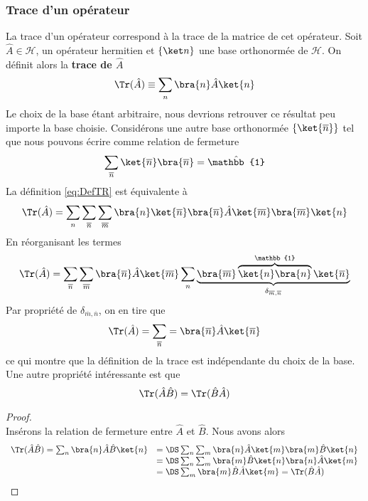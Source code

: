 \subsubsection{Trace d'un opérateur}
La trace d'un opérateur correspond à la trace de la matrice de cet opérateur. Soit $\hat{A}\in \mathcal{H}$, 
un opérateur hermitien et $\left\{\ket n\right\}$ une base orthonormée de $\mathcal{H}$. On définit alors la 
\textbf{trace de $\hat{A}$} 
\begin{equation}
\Tr(\hat{A}) \equiv \sum_n \bra{n}\hat{A}\ket{n}
\label{eq:DefTR}
\end{equation}
Le choix de la base étant arbitraire, nous devrions retrouver ce résultat peu importe la base choisie.  
Considérons une autre base orthonormée $\left\{\ket{\overline{n}}\right\}$ tel que nous pouvons écrire comme 
relation de fermeture
\begin{equation}
\sum_{\overline{n}}\ket{\overline{n}}\bra{\overline{n}} = \hat{\mathbb{1}}
\end{equation}
La définition \eqref{eq:DefTR} est équivalente à
\begin{equation}
\Tr(\hat{A}) = \sum_n\sum_{\overline{n}}\sum_{\overline{m}}\bra{n}\ket{\overline{n}} \bra{\overline{n}}\hat{A}\ket{\overline{m}}
\bra{\overline{m}}\ket{n}
\end{equation}
En réorganisant les termes
\begin{equation}
\Tr(\hat{A}) = \sum_{\overline{n}}\sum_{\overline{m}} \bra{\overline{n}}\hat{A}\ket{\overline{m}}\sum_n
\underbrace{\bra{\overline{m}}\overbrace{\ket{n}\bra{n}}^{\mathbb{1}}\ket{\overline{n}}}_{\delta_{\overline{m},
\overline{n}}}
\end{equation}
Par propriété de $\delta_{\overline{m},\overline{n}}$, on en tire que
\begin{equation}
\Tr(\hat{A}) = \sum_{\overline{n}} = \bra{\overline{n}}\hat{A}\ket{\overline{n}}
\end{equation}
ce qui montre que la définition de la trace est indépendante du choix de la base. Une autre propriété intéressante est que 
\begin{equation}
\Tr(\hat{A}\hat{B})  = \Tr(\hat{B}\hat{A})
\end{equation}
\begin{proof}\ \\
Insérons la relation de fermeture entre $\hat{A}$ et $\hat{B}$. Nous avons alors
\begin{equation}
\begin{array}{ll}
\Tr(\hat{A}\hat{B}) = \sum_n\bra{n}\hat{A}\hat{B}\ket{n} &=\DS \sum_n\sum_m \bra{n}\hat{A}\ket{m}\bra{m}\hat{B}\ket{n}\\
&=\DS \sum_n\sum_m \bra{m}\hat{B}\ket{n}\bra{n}\hat{A}\ket{m}\\
&=\DS \sum_m \bra{m}\hat{B}\hat{A}\ket{m} = \Tr(\hat{B}\hat{A})
\end{array}
\end{equation}
\end{proof}
